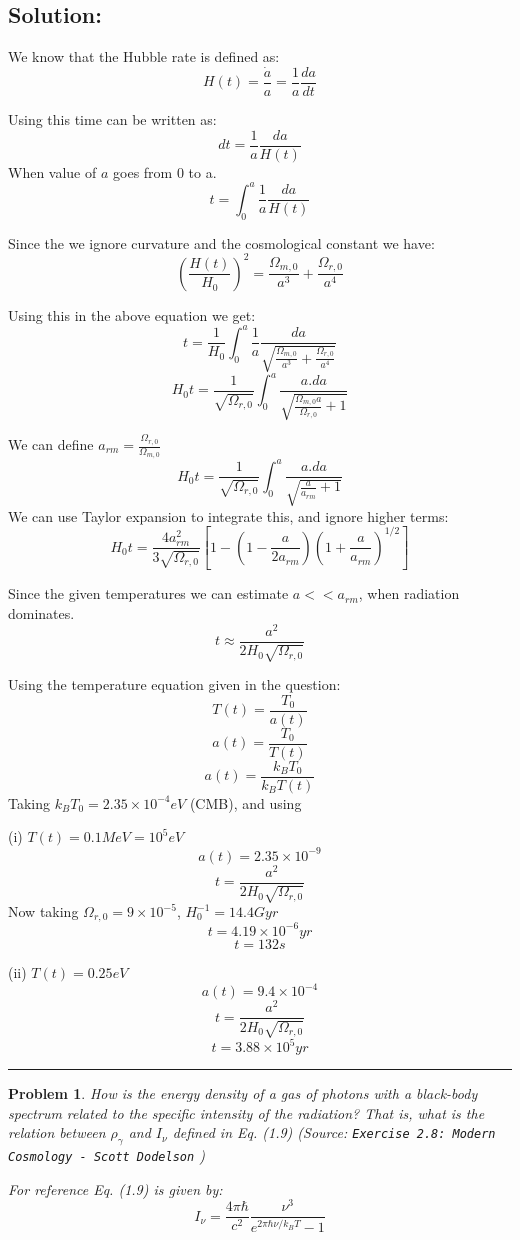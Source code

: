 \documentclass[11pt]{article}
\newenvironment{solution}{\subsection*{Solution:}}{\vspace{0.5cm} \hrule \vspace{0.7cm}}
\newtheorem{problem}{Problem}
\begin{document}
\begin{solution}

	We know that the Hubble rate is defined as:
	$$ H(t) = \frac{\dot a }{a} = \frac{1}{a} \frac{da}{dt} $$

	Using this time can be written as:
	$$ dt = \frac{1}{a} \frac{da}{H(t)} $$
	When value of $a$ goes from 0 to a.
	$$ t = \int^a_0 \frac{1}{a} \frac{da}{H(t)} $$

	Since the we ignore curvature and the cosmological constant we have:
	$$ \left(\frac{H(t)}{H_0}\right)^2 = \frac{\Omega_{m,0}}{a^3} + \frac{\Omega_{r,0}}{a^4}  $$

	Using this in the above equation we get:
	$$ t = \frac{1}{H_0} \int^a_0 \frac{1}{a} \frac{da}{\sqrt{\frac{\Omega_{m,0}}{a^3} + \frac{\Omega_{r,0}}{a^4}}} $$
	$$ H_0 t = \frac{1}{\sqrt{\Omega_{r,0}}} \int^a_0
	\frac{a.da}{\sqrt{\frac{\Omega_{m,0}a}{\Omega_{r,0}} + 1}} $$

	We can define $a_{rm} = \frac{\Omega_{r,0}}{\Omega_{m,0}}$
	$$ H_0 t = \frac{1}{\sqrt{\Omega_{r,0}}} \int^a_0
	\frac{a.da}{\sqrt{\frac{a}{a_{rm}} + 1}} $$
	We can use Taylor expansion to integrate this, and ignore higher terms:
	$$ H_0 t = \frac{4a^2_{rm}}{3\sqrt{\Omega_{r,0}}}\left[ 1 - \left(1 -
	\frac{a}{2a_{rm}}\right)\left( 1 + \frac{a}{a_{rm}} \right)^{1/2} \right] $$

	Since the given temperatures we can estimate $a << a_{rm}$, when
	radiation dominates.
	$$ t  \approx  \frac{a^2}{2H_0\sqrt{\Omega_{r,0}}}$$

	Using the temperature equation given in the question:
	$$ T(t) = \frac{T_0}{a(t)} $$
	$$ a(t) = \frac{T_0}{T(t)} $$
	$$ a(t) = \frac{k_B T_0}{k_B T(t)} $$
	Taking $k_B T_0 = 2.35\times 10^{-4} eV$ (CMB), and using

	(i) $T(t) = 0.1 MeV = 10^5 eV$
	$$ a(t) = 2.35 \times 10^{-9} $$
	$$ t  =  \frac{a^2}{2H_0\sqrt{\Omega_{r,0}}}$$
	Now taking $\Omega_{r,0} = 9 \times 10^{-5}$, $H_0^{-1} = 14.4 Gyr$
	$$ t  = 4.19 \times 10^{-6} yr $$
	$$ t  = 132 s $$

	(ii) $T(t) = 0.25 eV$
	$$ a(t) = 9.4 \times 10^{-4} $$
	$$ t  =  \frac{a^2}{2H_0\sqrt{\Omega_{r,0}}}$$
	$$ t  = 3.88 \times 10^5 yr $$


\end{solution}

\begin{problem}
	How is the energy density of a gas of photons with a black-body spectrum
	related to
	the specific intensity of the radiation? That is, what is the relation
	between $\rho_{\gamma}$ and $I_{\nu}$
	defined in Eq. (1.9) (Source: \texttt{Exercise 2.8: Modern Cosmology - Scott Dodelson} )

	For reference Eq. (1.9) is given by:
	$$ I_\nu = \frac{4\pi\hbar}{c^2} \frac{\nu^3}{e^{2\pi\hbar\nu/k_BT} - 1} $$


\end{problem}
\end{document}
